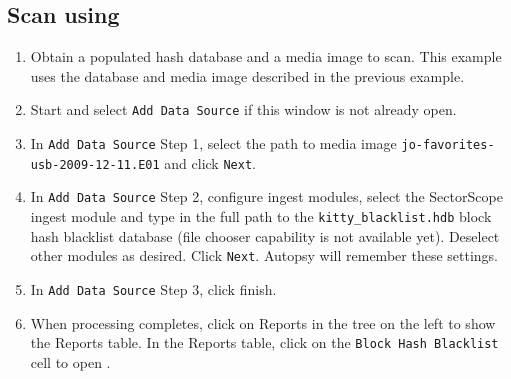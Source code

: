 \documentclass[11pt,fleqn]{article} %
\begin{document}
\subsection{Scan using \aut}
\begin{enumerate}
\item Obtain a populated hash database and a media image to scan. This example uses the database and media image described in the previous example.
\item Start \aut and select \verb+Add Data Source+ if this window is not already open.
\item In \verb+Add Data Source+ Step 1, select the path to media image \verb+jo-favorites-usb-2009-12-11.E01+ and click \verb+Next+.
\item In \verb+Add Data Source+ Step 2, configure ingest modules, select the SectorScope ingest module and type in the full path to the \verb+kitty_blacklist.hdb+ block hash blacklist database (file chooser capability is not available yet). Deselect other modules as desired. Click \verb+Next+. Autopsy will remember these settings.
\item In \verb+Add Data Source+ Step 3, click finish.
\item When processing completes, click on Reports in the tree on the left to show the Reports table. In the Reports table, click on the \verb+Block Hash Blacklist+ cell to open \sscope.
\end{enumerate}
\end{document}
